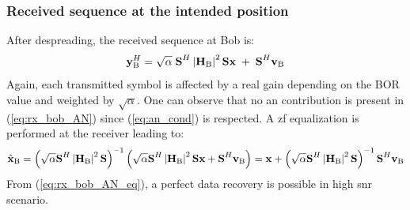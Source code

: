 \subsubsection{Received sequence at the intended position}
After despreading, the received sequence at Bob is: 
\begin{equation}
    \textbf{y}_{\text{B}}^H = \sqrt{\alpha} \; \textbf{S}^H \left|\textbf{H}_{\text{B}}\right|^2 \textbf{S} \textbf{x} \;  +  \;  \textbf{S}^H \textbf{v}_\text{B} 
    \label{eq:rx_bob_AN}
\end{equation}
Again, each transmitted symbol is affected by a real gain depending on the BOR value and weighted by $\sqrt{\alpha}$. One can observe that no \gls{an} contribution is present in (\ref{eq:rx_bob_AN}) since (\ref{eq:an_cond}) is respected. A \gls{zf} equalization is performed at the receiver leading to:
\begin{equation}
    \hat{\textbf{x}}_{\text{B}} = \left( \sqrt{\alpha} \textbf{S}^H \left|\textbf{H}_{\text{B}}\right|^2 \textbf{S} \right)^{-1}  \left(\sqrt{\alpha}  \textbf{S}^H\left|\textbf{H}_{\text{B}}\right|^2 \textbf{S} \textbf{x}   +    \textbf{S}^H \textbf{v}_\text{B}\right)= \textbf{x} + \left( \sqrt{\alpha} \textbf{S}^H \left|\textbf{H}_{\text{B}}\right|^2 \textbf{S} \right)^{-1} \textbf{S}^H \textbf{v}_\text{B}
    \label{eq:rx_bob_AN_eq}
\end{equation}
From (\ref{eq:rx_bob_AN_eq}), a perfect data recovery is possible in high \gls{snr} scenario.



